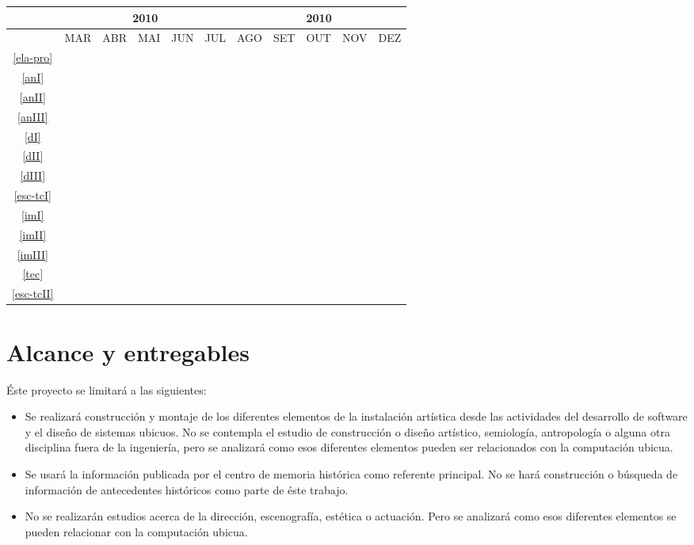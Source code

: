 \begin{table}[!htbp]
	\centering
		\begin{tabular}{|c|c|c|c|c|c|c|c|c|c|c|}
		\hline
		&\multicolumn{5}{c|}{2010}&\multicolumn{5}{c|}{2010}\\
		\hline
		&MAR&ABR&MAI&JUN&JUL&AGO&SET&OUT&NOV&DEZ\\
		\hline
		\ref{ela-pro}&\cellcolor{midgray}&&&&&&&&&\\
		\hline
		\ref{anI}&&\cellcolor{midgray}&&&&&&&&\\
		\hline	
		\ref{anII}&&\cellcolor{midgray}&&&&&&&&\\
		\hline			
		\ref{anIII}&&\cellcolor{midgray}&\cellcolor{midgray}&&&&&&&\\
		\hline	
		\ref{dI}&&&\cellcolor{midgray}&&&&&&&\\
		\hline
		\ref{dII}&&&\cellcolor{midgray}&\cellcolor{midgray}&&&&&&\\
		\hline	
		\ref{dIII}&&&&\cellcolor{midgray}&\cellcolor{midgray}&&&&&\\
		\hline	
		\ref{esc-tcI}&&&\cellcolor{midgray}&\cellcolor{midgray}&\cellcolor{midgray}&&&&&\\
		\hline	
		\ref{imI}&&&&&\cellcolor{midgray}&&&&&\\
		\hline	
		\ref{imII}&&&&&&\cellcolor{midgray}&&&&\\
		\hline	
		\ref{imIII}&&&&&&\cellcolor{midgray}&\cellcolor{midgray}&\cellcolor{midgray}&&\\
		\hline	
		\ref{tec}&&&&&&&&\cellcolor{midgray}&\cellcolor{midgray}&\\
		\hline	
		\ref{esc-tcII}&&&&&&&&\cellcolor{midgray}&\cellcolor{midgray}&\cellcolor{midgray}\\
		\hline	
		\end{tabular}
\end{table}

\section{Alcance y entregables}

Éste proyecto se limitará a las siguientes:

\begin{itemize}
    \item Se realizará construcción y montaje de los diferentes elementos de la instalación artística desde las actividades del desarrollo de software y el diseño de sistemas ubicuos. No se contempla el estudio de construcción o diseño artístico, semiología, antropología o alguna otra disciplina fuera de la ingeniería, pero se analizará como esos diferentes elementos pueden ser relacionados con la computación ubicua.
    \item Se usará la información publicada por el centro de memoria histórica como referente principal. No se hará construcción o búsqueda de información de antecedentes históricos como parte de éste trabajo.
    \item No se realizarán estudios acerca de la dirección, escenografía, estética o actuación. Pero se analizará como esos diferentes elementos se pueden relacionar con la computación ubicua.
\end{itemize}

